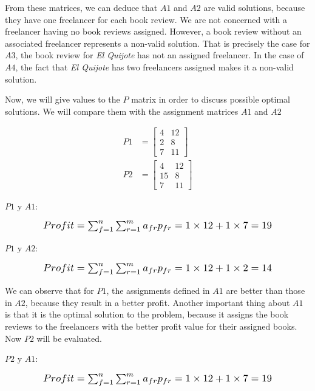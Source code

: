 From these matrices, we can deduce that $A1$ and $A2$ are valid solutions, because they have one freelancer for each book review. We are not concerned with a freelancer having no book reviews assigned. However, a book review without an associated freelancer represents a non-valid solution. That is precisely the case for $A3$, the book review for \textit{El Quijote} has not an assigned freelancer. In the case of $A4$, the fact that \textit{El Quijote} has two freelancers assigned makes it a non-valid solution.

Now, we will give values to the $P$ matrix in order to discuss possible optimal solutions. We will compare them with the assignment matrices $A1$ and $A2$

\begin{align}
    P1 &= 
    \begin{bmatrix}
        4 & 12\\ 
        2 & 8\\ 
        7 & 11 
    \end{bmatrix} \\
    P2 &= 
    \begin{bmatrix}
        4 & 12\\ 
        15 & 8\\ 
        7 & 11 
    \end{bmatrix}
\end{align}

$P1$ y $A1$:

\begin{equation}
    \scalebox{1.2}{$Profit = \sum_{f=1}^n \sum_{r=1}^m a_{fr} p_{fr} = 1 \times 12 + 1 \times 7 = 19$}
\end{equation}

$P1$ y $A2$:

\begin{equation}
    \scalebox{1.2}{$Profit = \sum_{f=1}^n \sum_{r=1}^m a_{fr} p_{fr} = 1 \times 12 + 1 \times 2 = 14$}
\end{equation}

We can observe that for $P1$, the assignments defined in $A1$ are better than those in $A2$, because they result in a better profit. Another important thing about $A1$ is that it is the optimal solution to the problem, because it assigns the book reviews to the freelancers with the better profit value for their assigned books. Now $P2$ will be evaluated.

$P2$ y $A1$:

\begin{equation}
    \scalebox{1.2}{$Profit = \sum_{f=1}^n \sum_{r=1}^m a_{fr} p_{fr} = 1 \times 12 + 1 \times 7 = 19$}
\end{equation}

